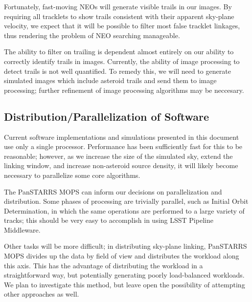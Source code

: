 \documentclass[12pt,preprint]{aastex}
\begin{document}
Fortunately, fast-moving NEOs will generate visible trails in our
images.  By requiring all tracklets to show trails consistent with
their apparent sky-plane velocity, we expect that it will be possible
to filter most false tracklet linkages, thus rendering the problem of
NEO searching manageable.

The ability to filter on trailing is dependent almost entirely on our
ability to correctly identify trails in images.  Currently, the
ability of image processing to detect trails is not well quantified.  To
remedy this, we will need to generate simulated images which include
asteroid trails and send them to image processing; further refinement
of image processing algorithms may be neccesary.



\subsection{Distribution/Parallelization of Software}

Current software implementations and simulations presented in this
document use only a single processor.  Performance has been
sufficiently fast for this to be reasonable; however, as we increase
the size of the simulated sky, extend the linking window, and increase
non-asteroid source density, it will likely become necessary to
parallelize some core algorithms.

The PanSTARRS MOPS can inform our decisions on parallelization and
distribution.  Some phases of processing are trivially parallel, such
as Initial Orbit Determination, in which the same operations are
performed to a large variety of tracks; this should be very easy to
accomplish in using LSST Pipeline Middleware.  

Other tasks will be more difficult; in distributing sky-plane linking,
PanSTARRS MOPS divides up the data by field of view and distributes
the workload along this axis.  This has the advantage of distributing
the workload in a straightforward way, but potentially generating
poorly load-balanced workloads.  We plan to investigate this method,
but leave open the possibility of attempting other approaches as well.




\end{document}
